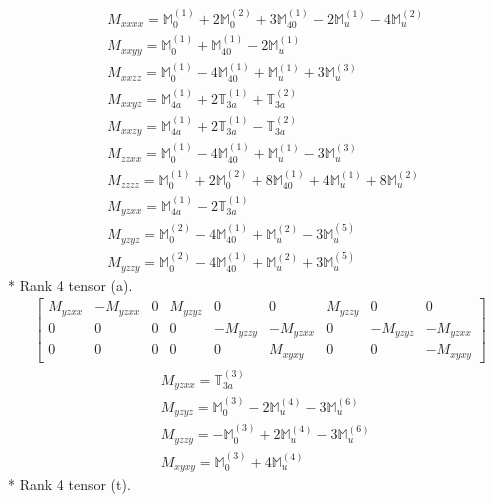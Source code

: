 \documentclass[fleqn,8pt,landscape]{jsarticle}
\begin{document}
\begin{align*}
& M_{xxxx} = \mathbb{M}_{0}^{(1)} + 2 \mathbb{M}_{0}^{(2)} + 3 \mathbb{M}_{40}^{(1)} - 2 \mathbb{M}_{u}^{(1)} - 4 \mathbb{M}_{u}^{(2)} \\
& M_{xxyy} = \mathbb{M}_{0}^{(1)} + \mathbb{M}_{40}^{(1)} - 2 \mathbb{M}_{u}^{(1)} \\
& M_{xxzz} = \mathbb{M}_{0}^{(1)} - 4 \mathbb{M}_{40}^{(1)} + \mathbb{M}_{u}^{(1)} + 3 \mathbb{M}_{u}^{(3)} \\
& M_{xxyz} = \mathbb{M}_{4a}^{(1)} + 2 \mathbb{T}_{3a}^{(1)} + \mathbb{T}_{3a}^{(2)} \\
& M_{xxzy} = \mathbb{M}_{4a}^{(1)} + 2 \mathbb{T}_{3a}^{(1)} - \mathbb{T}_{3a}^{(2)} \\
& M_{zzxx} = \mathbb{M}_{0}^{(1)} - 4 \mathbb{M}_{40}^{(1)} + \mathbb{M}_{u}^{(1)} - 3 \mathbb{M}_{u}^{(3)} \\
& M_{zzzz} = \mathbb{M}_{0}^{(1)} + 2 \mathbb{M}_{0}^{(2)} + 8 \mathbb{M}_{40}^{(1)} + 4 \mathbb{M}_{u}^{(1)} + 8 \mathbb{M}_{u}^{(2)} \\
& M_{yzxx} = \mathbb{M}_{4a}^{(1)} - 2 \mathbb{T}_{3a}^{(1)} \\
& M_{yzyz} = \mathbb{M}_{0}^{(2)} - 4 \mathbb{M}_{40}^{(1)} + \mathbb{M}_{u}^{(2)} - 3 \mathbb{M}_{u}^{(5)} \\
& M_{yzzy} = \mathbb{M}_{0}^{(2)} - 4 \mathbb{M}_{40}^{(1)} + \mathbb{M}_{u}^{(2)} + 3 \mathbb{M}_{u}^{(5)}
\end{align*}
* Rank 4 tensor (a).
\begin{align*}
\begin{bmatrix} M_{yzxx} & - M_{yzxx} & 0 & M_{yzyz} & 0 & 0 & M_{yzzy} & 0 & 0 \\ 0 & 0 & 0 & 0 & - M_{yzzy} & - M_{yzxx} & 0 & - M_{yzyz} & - M_{yzxx} \\ 0 & 0 & 0 & 0 & 0 & M_{xyxy} & 0 & 0 & - M_{xyxy} \end{bmatrix}
\end{align*}
\begin{align*}
& M_{yzxx} = \mathbb{T}_{3a}^{(3)} \\
& M_{yzyz} = \mathbb{M}_{0}^{(3)} - 2 \mathbb{M}_{u}^{(4)} - 3 \mathbb{M}_{u}^{(6)} \\
& M_{yzzy} = - \mathbb{M}_{0}^{(3)} + 2 \mathbb{M}_{u}^{(4)} - 3 \mathbb{M}_{u}^{(6)} \\
& M_{xyxy} = \mathbb{M}_{0}^{(3)} + 4 \mathbb{M}_{u}^{(4)}
\end{align*}
* Rank 4 tensor (t).
\end{document}
